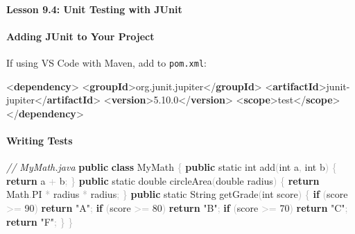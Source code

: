 \documentclass[
  justified,
  openright,
]{tufte-book}
\let\subsection\paragraph
\let\paragraph\paragraph
\newcommand{\KeywordTok}[1]{\textcolor{CodeKeyword}{\textbf{#1}}}  %
\newcommand{\StringTok}[1]{\textcolor{CodeString}{#1}}              %
\newcommand{\CommentTok}[1]{\textcolor{CodeComment}{\textit{#1}}}  %
\newcommand{\CodeNumTok}[1]{\textcolor{CodeNumber}{#1}}             %
\newcommand{\CodeFuncTok}[1]{\textcolor{CodeKeyword}{#1}}           %
\newcommand{\CodeTypeTok}[1]{\textcolor{CodeType}{#1}}              %
\newcommand{\OperatorTok}[1]{\textcolor{DarkGray}{#1}}              %
\newenvironment{Shaded}{%
  \begin{mdframed}[style=TufteCode]%
}{%
  \end{mdframed}%
}
\let\subsection\paragraph
\let\paragraph\paragraph
\begin{document}
\subsection{Lesson 9.4: Unit Testing with
JUnit}\label{lesson-9.4-unit-testing-with-junit}

\subsection{Adding JUnit to Your
Project}\label{adding-junit-to-your-project}

If using VS Code with Maven, add to \texttt{pom.xml}:

\begin{Shaded}
\begin{Highlighting}[]
\textless{}\KeywordTok{dependency}\textgreater{}
    \textless{}\KeywordTok{groupId}\textgreater{}org.junit.jupiter\textless{}/\KeywordTok{groupId}\textgreater{}
    \textless{}\KeywordTok{artifactId}\textgreater{}junit{-}jupiter\textless{}/\KeywordTok{artifactId}\textgreater{}
    \textless{}\KeywordTok{version}\textgreater{}5.10.0\textless{}/\KeywordTok{version}\textgreater{}
    \textless{}\KeywordTok{scope}\textgreater{}test\textless{}/\KeywordTok{scope}\textgreater{}
\textless{}/\KeywordTok{dependency}\textgreater{}
\end{Highlighting}
\end{Shaded}

\subsection{Writing Tests}\label{writing-tests-1}

\begin{Shaded}
\begin{Highlighting}[]
\CommentTok{// MyMath.java}
\KeywordTok{public} \KeywordTok{class} MyMath \OperatorTok{\{}
    \KeywordTok{public} \CodeTypeTok{static} \CodeTypeTok{int} \CodeFuncTok{add}\OperatorTok{(}\CodeTypeTok{int} a\OperatorTok{,} \CodeTypeTok{int} b\OperatorTok{)} \OperatorTok{\{} \KeywordTok{return} a \OperatorTok{+} b\OperatorTok{;} \OperatorTok{\}}
    \KeywordTok{public} \CodeTypeTok{static} \CodeTypeTok{double} \CodeFuncTok{circleArea}\OperatorTok{(}\CodeTypeTok{double} radius\OperatorTok{)} \OperatorTok{\{} \KeywordTok{return} Math\OperatorTok{.}\CodeFuncTok{PI} \OperatorTok{*} radius \OperatorTok{*} radius\OperatorTok{;} \OperatorTok{\}}
    \KeywordTok{public} \CodeTypeTok{static} String \CodeFuncTok{getGrade}\OperatorTok{(}\CodeTypeTok{int} score\OperatorTok{)} \OperatorTok{\{}
        \KeywordTok{if} \OperatorTok{(}score \OperatorTok{\textgreater{}=} \CodeNumTok{90}\OperatorTok{)} \KeywordTok{return} \StringTok{"A"}\OperatorTok{;}
        \KeywordTok{if} \OperatorTok{(}score \OperatorTok{\textgreater{}=} \CodeNumTok{80}\OperatorTok{)} \KeywordTok{return} \StringTok{"B"}\OperatorTok{;}
        \KeywordTok{if} \OperatorTok{(}score \OperatorTok{\textgreater{}=} \CodeNumTok{70}\OperatorTok{)} \KeywordTok{return} \StringTok{"C"}\OperatorTok{;}
        \KeywordTok{return} \StringTok{"F"}\OperatorTok{;}
    \OperatorTok{\}}
\OperatorTok{\}}
\end{Highlighting}
\end{Shaded}
\end{document}
